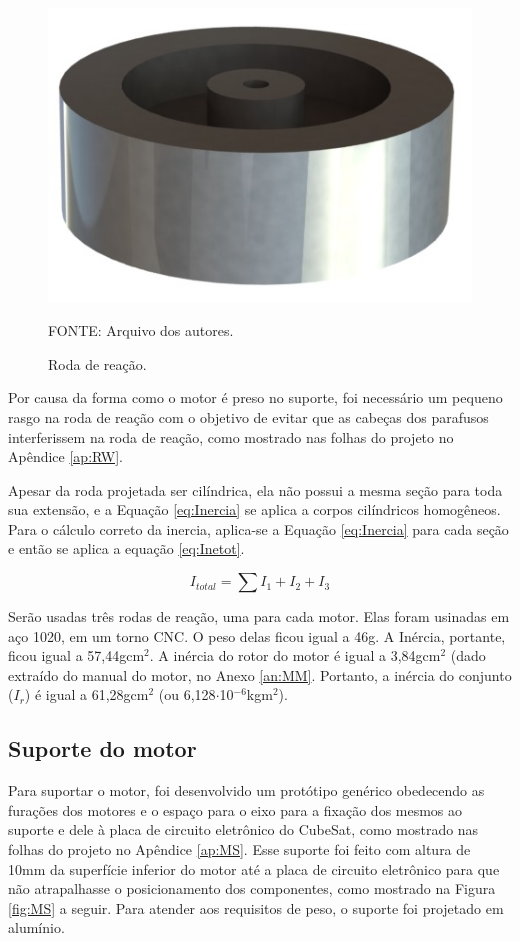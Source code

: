 \documentclass[
	12pt,				%
	openany,			%
	twoside,			%
	a4paper,			%
	english,			%
	french,				%
	spanish,			%
	brazil,				%
	oldfontcommands
	]{abntex2}
\begin{document}
\begin{figure}[th]
	\caption{Roda de reação.}
	\centering
	\includegraphics[width=0.5\linewidth]{./figs/Reaction_Wheel}
	
	\begin{small}
		FONTE: Arquivo dos autores.
	\end{small}
	\label{fig:RW}
\end{figure}

Por causa da forma como o motor é preso no suporte, foi necessário um pequeno rasgo na roda de reação com o objetivo de evitar que as cabeças dos parafusos interferissem na roda de reação, como mostrado nas folhas do projeto no Apêndice \ref{ap:RW}.

Apesar da roda projetada ser cilíndrica, ela não possui a mesma seção para toda sua extensão, e a Equação \ref{eq:Inercia} se aplica a corpos cilíndricos homogêneos. Para o cálculo correto da inercia, aplica-se a Equação \ref{eq:Inercia} para cada seção e então se aplica a equação \ref{eq:Inetot}.

\begin{equation}
I_{total} = \sum\nolimits I_{1} + I_{2} + I_{3}
\label{eq:Inetot}
\end{equation}

Serão usadas três rodas de reação, uma para cada motor. Elas foram usinadas em aço 1020, em um torno CNC. O peso delas ficou igual a 46g. A Inércia, portante, ficou igual a 57,44gcm$^{2}$. A inércia do rotor do motor é igual a 3,84gcm$^{2}$ (dado extraído do manual do motor, no Anexo \ref{an:MM}. Portanto, a inércia do conjunto ($I_{r}$) é igual a 61,28gcm$^{2}$ (ou 6,128$\cdot$10$^{-6}$kgm$^{2}$).

\subsection{Suporte do motor}

Para suportar o motor, foi desenvolvido um protótipo genérico obedecendo as furações dos motores e o espaço para o eixo para a fixação dos mesmos ao suporte e dele à placa de circuito eletrônico do CubeSat, como mostrado nas folhas do projeto no Apêndice \ref{ap:MS}. Esse suporte foi feito com altura de 10mm da superfície inferior do motor até a placa de circuito eletrônico para que não atrapalhasse o posicionamento dos componentes, como mostrado na Figura \ref{fig:MS} a seguir. Para atender aos requisitos de peso, o suporte foi projetado em alumínio.
\end{document}
